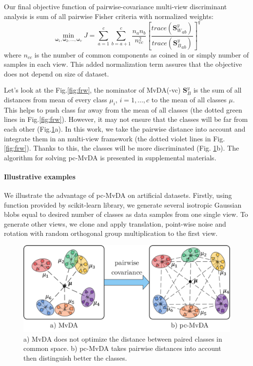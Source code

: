     Our final objective function of pairwise-covariance multi-view discriminant analysis is sum of all pairwise Fisher criteria with normalized weights:
    \begin{equation}
        \operatorname*{min}_{\boldsymbol{\omega}_1, \boldsymbol{\omega}_2,..., \boldsymbol{\omega}_v}{J}=\sum_{a=1}^{c}\sum_{b=a+1}^{c}{\frac{n_an_b}{n_{cc}^2}{\left[{\frac{trace\left({\boldsymbol{S}_W^y}_{ab}\right)}{trace\left({\boldsymbol{S}_B^y}_{ab}\right)}}\right]}^{q}}
        \label{eq:pc-MvDA}
    \end{equation}
    where $n_{cc}$ is the number of common components as coined in \cite{you2019multi} or simply number of samples in each view. This added normalization term assures that the objective does not depend on size of dataset.

    Let's look at the Fig.\ref{fig:frw}, the nominator of MvDA(-vc) $\boldsymbol{S}_B^y$ is the sum of all distances from mean of every class $\mu_i$, $i = {1,...,c}$ to the mean of all classes $\mu$. This helps to push class far away from the mean of all classes (the dotted green lines in Fig.\ref{fig:frw}). However, it may not ensure that the classes will be far from each other (Fig.\ref{fig:pc-MvDA}a). In this work, we take the pairwise distance into account and integrate them in an multi-view framework (the dotted violet lines in Fig.\ref{fig:frw}). Thanks to this, the classes will be more discriminated (Fig. \ref{fig:pc-MvDA}b). The algorithm for solving pc-MvDA is presented in supplemental materials. 

    \paragraph{Illustrative examples}
        We illustrate the advantage of pc-MvDA on artificial datasets. Firstly, using function provided by scikit-learn library, we generate several isotropic Gaussian blobs equal to desired number of classes as data samples from one single view. To generate other views, we clone and apply translation, point-wise noise and rotation with random orthogonal group multiplication to the first view.

        \begin{figure}[htbp]
            \centering
            \includegraphics[width=0.7\linewidth]{Figs/pc-MvDA.png}
            \caption{a) MvDA does not optimize the distance between paired classes in common space. b) pc-MvDA takes pairwise distances into account then distinguish better the classes.}
            \label{fig:pc-MvDA}
        \end{figure}

